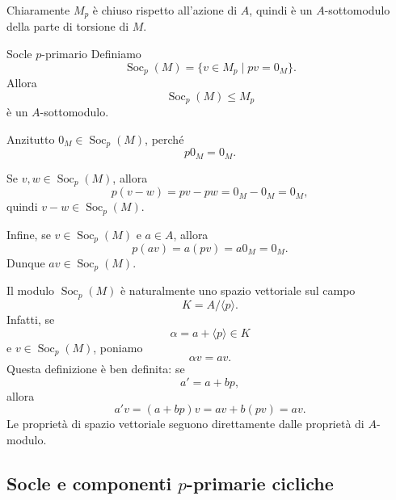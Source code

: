 \documentclass[a4paper]{article}
\begin{document}
\begin{radioactive}
Chiaramente \(M_p\) è chiuso rispetto all'azione di \(A\), quindi è un \(A\)-sottomodulo della parte di torsione di \(M\).
\end{radioactive}

\begin{radioactive}
\begin{snippetproposition}{Socle \(p\)-primario}
    Definiamo
    \[
        \operatorname{Soc}_p(M)
        =
        \{v\in M_p\mid pv=0_M\}.
    \]
    Allora
    \[
        \operatorname{Soc}_p(M)\leq M_p
    \]
    è un \(A\)-sottomodulo.
\end{snippetproposition}
\end{radioactive}

\begin{radioactive}
\begin{snippetproof}{}
    Anzitutto \(0_M\in \operatorname{Soc}_p(M)\), perché
    \[
        p0_M=0_M.
    \]

    Se \(v,w\in \operatorname{Soc}_p(M)\), allora
    \[
        p(v-w)=pv-pw=0_M-0_M=0_M,
    \]
    quindi \(v-w\in \operatorname{Soc}_p(M)\).

    Infine, se \(v\in \operatorname{Soc}_p(M)\) e \(a\in A\), allora
    \[
        p(av)=a(pv)=a0_M=0_M.
    \]
    Dunque \(av\in \operatorname{Soc}_p(M)\).
\end{snippetproof}
\end{radioactive}

\begin{radioactive}
\begin{snippetremark}{}
    Il modulo \(\operatorname{Soc}_p(M)\) è naturalmente uno spazio vettoriale sul campo
    \[
        K=A/\langle p \rangle.
    \]
    Infatti, se
    \[
        \alpha=a+\langle p \rangle\in K
    \]
    e \(v\in \operatorname{Soc}_p(M)\), poniamo
    \[
        \alpha v=av.
    \]
    Questa definizione è ben definita: se
    \[
        a'=a+bp,
    \]
    allora
    \[
        a'v=(a+bp)v=av+b(pv)=av.
    \]
    Le proprietà di spazio vettoriale seguono direttamente dalle proprietà di \(A\)-modulo.
\end{snippetremark}
\end{radioactive}

\pagebreak

\subsection{Socle e componenti \(p\)-primarie cicliche}
\end{document}
